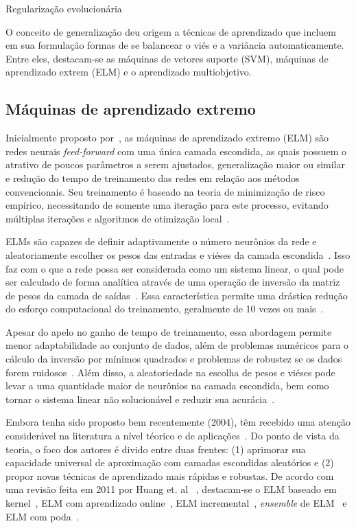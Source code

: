 \documentclass[conference]{IEEEtran}
\begin{document}
	
	Regularização evolucionária \cite{jin2004neural}

	O conceito de generalização deu origem a técnicas de aprendizado que incluem em sua formulação formas de se balancear o viés e a variância automaticamente. Entre eles, destacam-se as máquinas de vetores suporte (SVM), máquinas de aprendizado extrem (ELM)  e o aprendizado multiobjetivo.
	
	\subsection{Máquinas de aprendizado extremo}
	Inicialmente proposto por~\cite{huang2004extreme}, as máquinas de aprendizado extremo (ELM) são redes neurais \textit{feed-forward} com uma única camada escondida, as quais possuem o atrativo de poucos parâmetros a serem ajustados, generalização maior ou similar e redução do tempo de treinamento das redes em relação aos métodos convencionais. Seu treinamento é baseado na teoria de minimização de risco empírico, necessitando de somente uma iteração para este processo, evitando múltiplas iterações e algoritmos de otimização local~\cite{ding2015extreme}. 
	
	ELMs são capazes de definir adaptivamente o número neurônios da rede e aleatoriamente escolher os pesos das entradas e viéses da camada escondida~\cite{huang2006extreme}. Isso faz com o que a rede possa ser considerada como um sistema linear, o qual pode ser calculado de forma analítica através de uma operação de inversão da matriz de pesos da camada de saídas~\cite{huang2006extreme}. Essa característica permite uma drástica redução do esforço computacional do treinamento, geralmente de 10 vezes ou mais~\cite{deng2010research}. 
	
	Apesar do apelo no ganho de tempo de treinamento, essa abordagem permite menor adaptabilidade ao conjunto de dados, além de problemas numéricos para o cálculo da inversão por mínimos quadrados e problemas de robustez se os dados forem ruidosos~\cite{ding2015extreme}. Além disso, a aleatoriedade na  escolha de pesos e viéses pode levar a uma quantidade maior de neurônios na camada escondida, bem como tornar o sistema linear não solucionável e reduzir sua acurácia~\cite{wang2011study}.
	
	Embora tenha sido proposto bem recentemente (2004), têm recebido uma atenção considerável na literatura a nível téorico e de aplicações~\cite{huang2011survey}. Do ponto de vista da teoria, o foco dos autores é divido entre duas frentes: (1) aprimorar sua capacidade universal de aproximação com camadas escondidas aleatórios e (2) propor novas técnicas de aprendizado mais rápidas e robustas. De acordo com uma revisão feita em 2011 por Huang et. al ~\cite{huang2011survey}, destacam-se o ELM baseado em kernel~\cite{huang2011extreme},  ELM com aprendizado online~\cite{liang2006fast, zhang2018survey}, ELM incremental~\cite{huang2008enhanced}, \textit{ensemble} de ELM~\cite{sun2008sales, van2009adaptive, lan2009ensemble} e ELM com poda~\cite{rong2008fast}.
	
\end{document}
